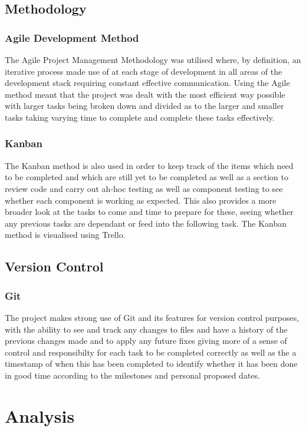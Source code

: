 \documentclass{report}
\begin{document}
	\section{Methodology}
		\subsection{Agile Development Method}
The Agile Project Management Methodology was utilised where, by definition, an iterative process made use of at each stage of development in all areas of the development stack requiring constant effective communication. Using the Agile method meant that the project was dealt with the most efficient way possible with larger tasks being broken down and divided as to the larger and smaller tasks taking varying time to complete and complete these tasks effectively.

		\subsection{Kanban}
The Kanban method is also used in order to keep track of the items which need to be completed and which are still yet to be completed as well as a section to review code and carry out ah-hoc testing as well as component testing to see whether each component is working as expected. This also provides a more broader look at the tasks to come and time to prepare for these, seeing whether any previous tasks are dependant or feed into the following task. The Kanban method is visualised using Trello.

	\section{Version Control}
		\subsection{Git}
The project makes strong use of Git and its features for version control purposes, with the ability to see and track any changes to files and have a history of the previous changes made and to apply any future fixes giving more of a sense of control and responsibilty for each task to be completed correctly as well as the a timestamp of when this has been completed to identify whether it has been done in good time according to the milestones and personal proposed dates.

\chapter{Analysis}
\end{document}

